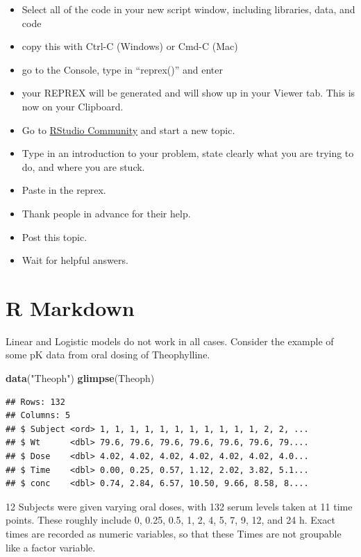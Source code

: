 \documentclass[
]{book}
\newenvironment{Shaded}{\begin{snugshade}}{\end{snugshade}}
\newcommand{\KeywordTok}[1]{\textcolor[rgb]{0.13,0.29,0.53}{\textbf{#1}}}
\newcommand{\NormalTok}[1]{#1}
\newcommand{\StringTok}[1]{\textcolor[rgb]{0.31,0.60,0.02}{#1}}
\providecommand{\tightlist}{%
  \setlength{\itemsep}{0pt}\setlength{\parskip}{0pt}}
\begin{document}
\begin{itemize}
\tightlist
\item
  Select all of the code in your new script window, including libraries, data, and code
\item
  copy this with Ctrl-C (Windows) or Cmd-C (Mac)
\item
  go to the Console, type in ``reprex()'' and enter
\item
  your REPREX will be generated and will show up in your Viewer tab. This is now on your Clipboard.
\item
  Go to \href{https://community.rstudio.com}{RStudio Community} and start a new topic.
\item
  Type in an introduction to your problem, state clearly what you are trying to do, and where you are stuck.
\item
  Paste in the reprex.
\item
  Thank people in advance for their help.
\item
  Post this topic.
\item
  Wait for helpful answers.
\end{itemize}

\hypertarget{r-markdown}{%
\section{R Markdown}\label{r-markdown}}

Linear and Logistic models do not work in all cases.
Consider the example of some pK data from oral dosing of Theophylline.

\begin{Shaded}
\begin{Highlighting}[]
\KeywordTok{data}\NormalTok{(}\StringTok{"Theoph"}\NormalTok{)}
\KeywordTok{glimpse}\NormalTok{(Theoph)}
\end{Highlighting}
\end{Shaded}

\begin{verbatim}
## Rows: 132
## Columns: 5
## $ Subject <ord> 1, 1, 1, 1, 1, 1, 1, 1, 1, 1, 1, 2, 2, ...
## $ Wt      <dbl> 79.6, 79.6, 79.6, 79.6, 79.6, 79.6, 79....
## $ Dose    <dbl> 4.02, 4.02, 4.02, 4.02, 4.02, 4.02, 4.0...
## $ Time    <dbl> 0.00, 0.25, 0.57, 1.12, 2.02, 3.82, 5.1...
## $ conc    <dbl> 0.74, 2.84, 6.57, 10.50, 9.66, 8.58, 8....
\end{verbatim}

12 Subjects were given varying oral doses, with 132 serum levels taken at 11 time points. These roughly include 0, 0.25, 0.5, 1, 2, 4, 5, 7, 9, 12, and 24 h. Exact times are recorded as numeric variables, so that these Times are not groupable like a factor variable.
\end{document}
